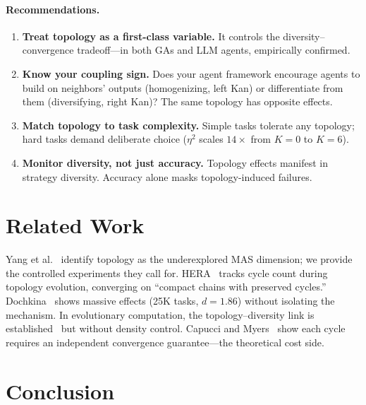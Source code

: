 \documentclass[10pt,twocolumn]{article}
\begin{document}
\paragraph{Recommendations.}
\begin{enumerate}
  \item \textbf{Treat topology as a first-class variable.}
    It controls the diversity--convergence tradeoff---in both GAs and
    LLM agents, empirically confirmed.
  \item \textbf{Know your coupling sign.} Does your agent framework
    encourage agents to build on neighbors' outputs (homogenizing,
    left Kan) or differentiate from them (diversifying, right Kan)?
    The same topology has opposite effects.
  \item \textbf{Match topology to task complexity.} Simple tasks
    tolerate any topology; hard tasks demand deliberate choice
    ($\eta^2$ scales $14\times$ from $K{=}0$ to $K{=}6$).
  \item \textbf{Monitor diversity, not just accuracy.} Topology
    effects manifest in strategy diversity. Accuracy alone masks
    topology-induced failures.
\end{enumerate}

\section{Related Work}
\label{sec:related}

Yang et al.~\citep{yang2025topology} identify topology as the
underexplored MAS dimension; we provide the controlled experiments
they call for. HERA~\citep{hera2026} tracks cycle count during
topology evolution, converging on ``compact chains with preserved
cycles.'' Dochkina~\citep{dochkina2026} shows massive effects (25K
tasks, $d = 1.86$) without isolating the mechanism. In evolutionary
computation, the topology--diversity link is
established~\citep{tomassini2005spatially,skolicki2005influence} but
without density control. Capucci and
Myers~\citep{capucci2026feedback} show each cycle requires an
independent convergence guarantee---the theoretical cost side.

\section{Conclusion}
\label{sec:conclusion}
\end{document}
